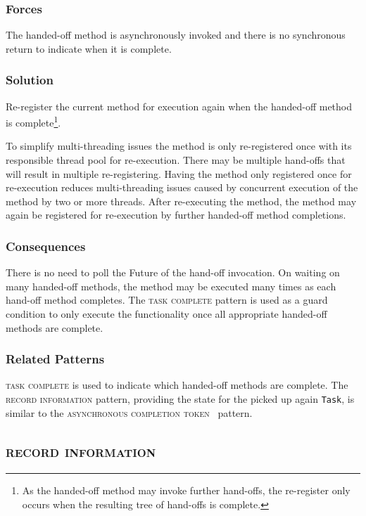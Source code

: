 \documentclass[prodmode]{style/acmlarge}
\begin{document}
\subsubsection*{Forces} The handed-off method is asynchronously invoked and there is
no synchronous return to indicate when it is complete.

\subsubsection*{\textbf{Solution}} Re-register the current method for execution again
when the handed-off method is complete\footnote{As the handed-off method may
invoke further hand-offs, the re-register only occurs when the resulting tree of
hand-offs is complete.}.

To simplify multi-threading issues the method is only re-registered once with
its responsible thread pool for re-execution.  There may be multiple hand-offs
that will result in multiple re-registering.  Having the method only registered
once for re-execution reduces multi-threading issues caused by concurrent
execution of the method by two or more threads.  After re-executing the method,
the method may again be registered for re-execution by further handed-off method
completions.

\subsubsection*{Consequences} There is no need to poll the Future of the
hand-off invocation.  On waiting on many handed-off methods, the method may be
executed many times as each hand-off method completes.  The \textsc{task
complete} pattern is used as a guard condition to only execute the functionality
once all appropriate handed-off methods are complete.

\subsubsection*{Related Patterns} \textsc{task complete} is used to indicate
which handed-off methods are complete.  The \textsc{record information} pattern,
providing the state for the picked up again \texttt{Task}, is similar to the
\textsc{asynchronous completion token}~\cite{posa} pattern.



\subsection{\textsc{\textbf{record information}}}
\end{document}
